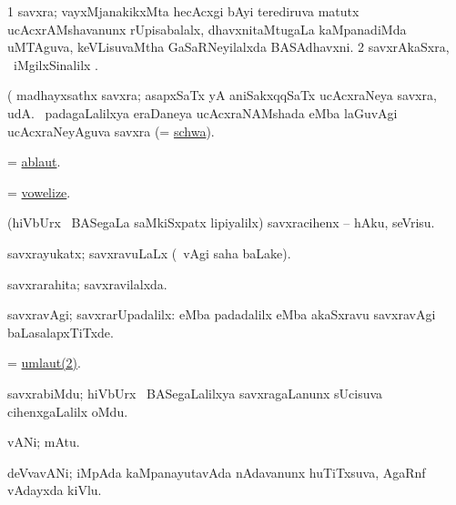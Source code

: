 \bentry
{} 
\gl{\nA}
\expl{}
\bmng
\bnum
\num{1} savxra; vayxMjanakikxMta hecAcxgi bAyi terediruva matutx ucAcxrAMshavanunx rUpisabalalx, dhavxnitaMtugaLa kaMpanadiMda uMTAguva, keVLisuvaMtha GaSaRNeyilalxda BASAdhavxni. 
\num{2} savxrAkaSxra, \udA\ iMgilxSinalilx . 
\enum
\emng

\noindent 
\gl{\pagu}
\expl{}
\bmng
  (    madhayxsathx savxra; asapxSaTx yA aniSakxqqSaTx ucAcxraNeya savxra, udA.  \mo\ padagaLalilxya eraDaneya ucAcxraNAMshada  eMba laGuvAgi ucAcxraNeyAguva savxra (= \hyperref{kandict_s.pdf}{S}{schwa}{schwa}). 
\emng
\eentry

\bentry
{}
\gl{\nA}
\expl{}
\bmng
 = \hyperref{kandict_a.pdf}{A}{ablaut}{ablaut}. 
\emng
\eentry

\bentry
{} 
\gl{\sakirx}
\expl{}
\bmng
 = \hyperlink{vowelize}{vowelize}. 
\emng
\eentry

\bentry
{} 
\gl{\sakirx}
\expl{}
\bmng
 (hiVbUrx \mo\ BASegaLa saMkiSxpatx lipiyalilx) savxracihenx -- hAku, seVrisu. 
\emng
\eentry

\bentry
{} 
\gl{\gu}
\expl{}
\bmng
 savxrayukatx; savxravuLaLx (\saMpa\ vAgi saha baLake). 
\emng
\eentry

\bentry
{} 
\gl{\gu}
\expl{}
\bmng
 savxrarahita; savxravilalxda. 
\emng
\eentry

\bentry 
{} 
\gl{\kirxvi}
\expl{}
\bmng
 savxravAgi; savxrarUpadalilx:  eMba padadalilx  eMba akaSxravu savxravAgi baLasalapxTiTxde. 
\emng
\eentry

\bentry
{}
\gl{\nA}
\expl{}
\bmng
 = \hyperref{kandict_u.pdf}{U}{umlaut(2)}{umlaut(2)}. 
\emng
\eentry

\bentry
{} 
\pron{}
\gl{\nA}
\expl{}
\bmng
 savxrabiMdu; hiVbUrx \mo\ BASegaLalilxya savxragaLanunx sUcisuva cihenxgaLalilx oMdu. 
\emng
\eentry

\bentry 
{} 
\gl{\nA}
\expl{}
\bmng
 vANi; mAtu. 
\emng
\eentry

\bentry 
{} 
\gl{\nA}
\expl{\Latin}
\bmng
deVvavANi; iMpAda kaMpanayutavAda nAdavanunx huTiTxsuva, AgaRnf vAdayxda kiVlu. 
\emng
\eentry


